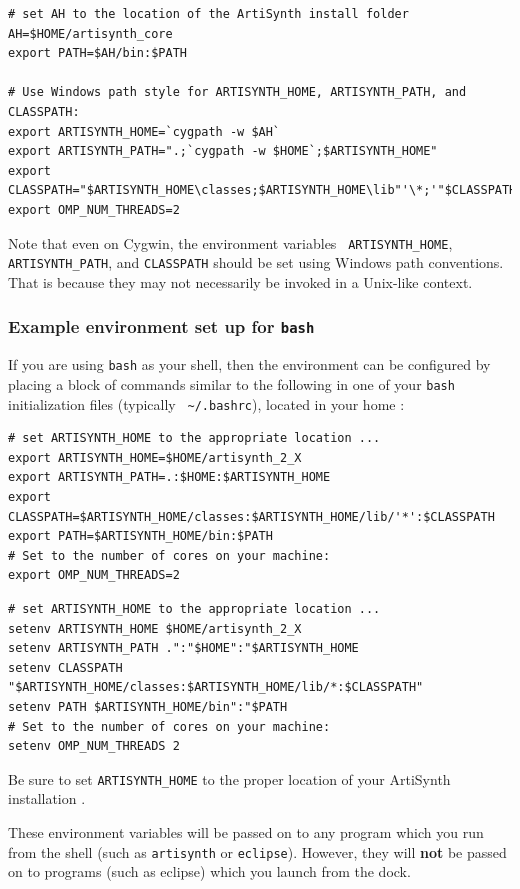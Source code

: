 \begin{lstlisting}[]
# set AH to the location of the ArtiSynth install folder
AH=$HOME/artisynth_core
export PATH=$AH/bin:$PATH

# Use Windows path style for ARTISYNTH_HOME, ARTISYNTH_PATH, and CLASSPATH:
export ARTISYNTH_HOME=`cygpath -w $AH`
export ARTISYNTH_PATH=".;`cygpath -w $HOME`;$ARTISYNTH_HOME"
export CLASSPATH="$ARTISYNTH_HOME\classes;$ARTISYNTH_HOME\lib"'\*;'"$CLASSPATH"
export OMP_NUM_THREADS=2
\end{lstlisting}

Note that even on Cygwin, the environment variables {\tt
ARTISYNTH\_HOME}, {\tt ARTISYNTH\_PATH}, and {\tt CLASSPATH} should be
set using Windows path conventions. That is because they may not
necessarily be invoked in a Unix-like context.
\fi

\ifWindows\else
\subsubsection{Example environment set up for {\tt bash}}
\label{BashEnvironmentSetup}

If you are using {\tt bash} as your shell, then the environment can be
configured by placing a block of commands similar to the following in
one of your {\tt bash} initialization files (typically {\tt
\textasciitilde/.bashrc}), located in your home \directory{}:

\ifLinux
\begin{lstlisting}[]
# set ARTISYNTH_HOME to the appropriate location ...
export ARTISYNTH_HOME=$HOME/artisynth_2_X
export ARTISYNTH_PATH=.:$HOME:$ARTISYNTH_HOME
export CLASSPATH=$ARTISYNTH_HOME/classes:$ARTISYNTH_HOME/lib/'*':$CLASSPATH
export PATH=$ARTISYNTH_HOME/bin:$PATH
# Set to the number of cores on your machine:
export OMP_NUM_THREADS=2 
\end{lstlisting}
\else\ifMacOS
\begin{lstlisting}[]
# set ARTISYNTH_HOME to the appropriate location ...
setenv ARTISYNTH_HOME $HOME/artisynth_2_X
setenv ARTISYNTH_PATH .":"$HOME":"$ARTISYNTH_HOME
setenv CLASSPATH "$ARTISYNTH_HOME/classes:$ARTISYNTH_HOME/lib/*:$CLASSPATH"
setenv PATH $ARTISYNTH_HOME/bin":"$PATH
# Set to the number of cores on your machine:
setenv OMP_NUM_THREADS 2 
\end{lstlisting}
\fi\fi

Be sure to set {\tt ARTISYNTH\_HOME} to the proper location of your
ArtiSynth installation \directory{}.

These environment variables will be passed on to any program which you
run from the shell (such as {\tt artisynth} or {\tt eclipse}).
\ifMacOS
However, they will {\bf not} be passed on to programs (such as eclipse)
which you launch from the dock.
\fi

